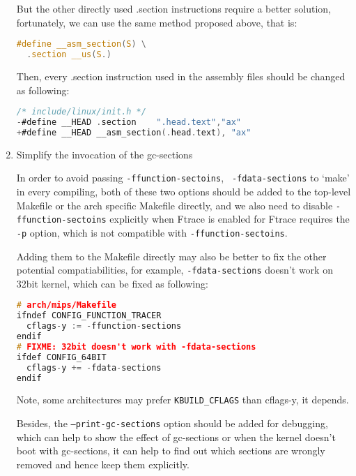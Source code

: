 \documentclass[10pt,a4paper]{article}
\begin{document}
\begin{multicols}{2}
\begin{enumerate}
But the other directly used .section instructions require a better solution,
fortunately, we can use the same method proposed above, that is:

\begin{lstlisting}[language=c,
                  commentstyle=\fontsize{7}{8}\selectfont,
                  basicstyle=\ttfamily\fontsize{7}{8}\selectfont]
#define __asm_section(S) \
  .section __us(S.)
\end{lstlisting}

Then, every .section instruction used in the assembly files should be changed
as following:

\begin{lstlisting}[language=c,
                  commentstyle=\fontsize{7}{8}\selectfont,
                  basicstyle=\ttfamily\fontsize{7}{8}\selectfont]
/* include/linux/init.h */
-#define __HEAD	.section	".head.text","ax"
+#define __HEAD	__asm_section(.head.text), "ax"
\end{lstlisting}

\item Simplify the invocation of the gc-sections

In order to avoid passing {\small {\tt -ffunction-sectoins}}, {\small {\tt
-fdata-sections}} to `make' in every compiling, both of these two options
should be added to the top-level Makefile or the arch specific Makefile
directly, and we also need to disable {\small {\tt -ffunction-sectoins}}
explicitly when Ftrace is enabled for Ftrace requires the {\small {\tt -p}}
option, which is not compatible with {\small {\tt -ffunction-sectoins}}.

Adding them to the Makefile directly may also be better to fix the other
potential compatiabilities, for example, {\small {\tt -fdata-sections}} doesn't
work on 32bit kernel, which can be fixed as following:

\begin{lstlisting}[language=c,
                  commentstyle=\fontsize{7}{8}\selectfont,
                  basicstyle=\ttfamily\fontsize{7}{8}\selectfont]
# arch/mips/Makefile
ifndef CONFIG_FUNCTION_TRACER
  cflags-y := -ffunction-sections
endif
# FIXME: 32bit doesn't work with -fdata-sections
ifdef CONFIG_64BIT
  cflags-y += -fdata-sections
endif
\end{lstlisting}

Note, some architectures may prefer {\small {\tt KBUILD\_CFLAGS}} than
cflags-y, it depends.

Besides, the {\small {\tt --print-gc-sections}} option should be added for
debugging, which can help to show the effect of gc-sections or when the kernel
doesn't boot with gc-sections, it can help to find out which sections are
wrongly removed and hence keep them explicitly.


\end{enumerate}
\end{multicols}
\end{document}
